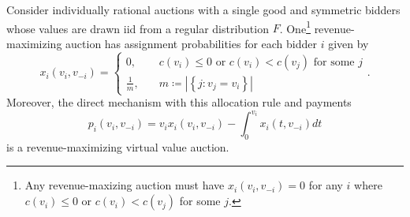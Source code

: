 \begin{theorem}
	Consider individually rational auctions with a single good and symmetric bidders whose values are drawn iid from a regular distribution $F$. One\footnote{Any revenue-maxizing auction must have $x_i(v_i,v_{-i}) = 0$ for any $i$ where $c(v_i) \le 0$ or $c(v_i) < c(v_j)$ for some $j$.} revenue-maximizing auction has assignment probabilities for each bidder $i$ given by
	\[
		x_i \left( v_i,v_{-i} \right) = \begin{cases}
			0, \quad &c(v_i) \le 0 \text{ or } c(v_i) < c(v_j) \text{ for some }j \\
			\frac{1}{m}, \quad & m \coloneqq \left| \left\{j: v_j = v_i\right\} \right|
		\end{cases}
	.\]
	Moreover, the direct mechanism with this allocation rule and payments
	\[
		p_i(v_i,v_{-i}) = v_ix_i(v_i,v_{-i}) - \int_{0}^{v_i} x_i(t,v_{-i})dt
	\]
	is a revenue-maximizing virtual value auction.
\end{theorem}

